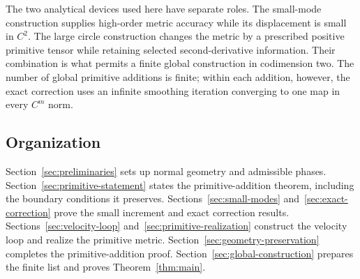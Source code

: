 The two analytical devices used here have separate roles. The small-mode
construction supplies high-order metric accuracy while its displacement is
small in $C^2$. The large circle construction changes the metric by a prescribed
positive primitive tensor while retaining selected second-derivative
information. Their combination is what permits a finite global construction
in codimension two.  The number of global primitive additions is finite;
within each addition, however, the exact correction uses an infinite
smoothing iteration converging to one map in every $C^m$ norm.

\subsection{Organization}
Section~\ref{sec:preliminaries} sets up normal geometry and admissible phases.
Section~\ref{sec:primitive-statement} states the primitive-addition theorem,
including the boundary conditions it preserves.
Sections~\ref{sec:small-modes} and~\ref{sec:exact-correction} prove the small
increment and exact correction results.
Sections~\ref{sec:velocity-loop} and~\ref{sec:primitive-realization} construct
the velocity loop and realize the primitive metric.
Section~\ref{sec:geometry-preservation} completes the primitive-addition proof.
Section~\ref{sec:global-construction} prepares the finite list and proves
Theorem~\ref{thm:main}.
